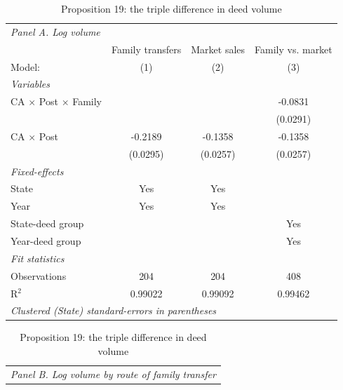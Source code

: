 
\begin{table}[htbp]
   \caption{\label{tab:prop19} Proposition 19: the triple difference in deed volume}
   \centering
   \scriptsize
   \begin{tabular}{lccc}
      \tabularnewline \midrule \midrule
         \multicolumn{4}{l}{\emph{Panel A. Log volume}} \\
                                         & Family transfers & Market sales & Family vs. market \\
      Model:                             & (1)              & (2)          & (3)\\
      \midrule
      \emph{Variables}\\
      CA $\times$ Post $\times$ Family   &                  &              & -0.0831\\
                                         &                  &              & (0.0291)\\
      CA $\times$ Post                   & -0.2189          & -0.1358      & -0.1358\\
                                         & (0.0295)         & (0.0257)     & (0.0257)\\
      \midrule
      \emph{Fixed-effects}\\
      State                              & Yes              & Yes          & \\
      Year                               & Yes              & Yes          & \\
      State-deed group                   &                  &              & Yes\\
      Year-deed group                    &                  &              & Yes\\
      \midrule
      \emph{Fit statistics}\\
      Observations                       & 204              & 204          & 408\\
      R$^2$                              & 0.99022          & 0.99092      & 0.99462\\
      \midrule \midrule
      \multicolumn{4}{l}{\emph{Clustered (State) standard-errors in parentheses}}\\
   \end{tabular}
   \par\vspace{8pt}
   {\scriptsize\begin{tabular}{lrrccc}
      \multicolumn{6}{l}{\emph{Panel B. Log volume by route of family transfer}} \\

\end{tabular}}
\end{table}
